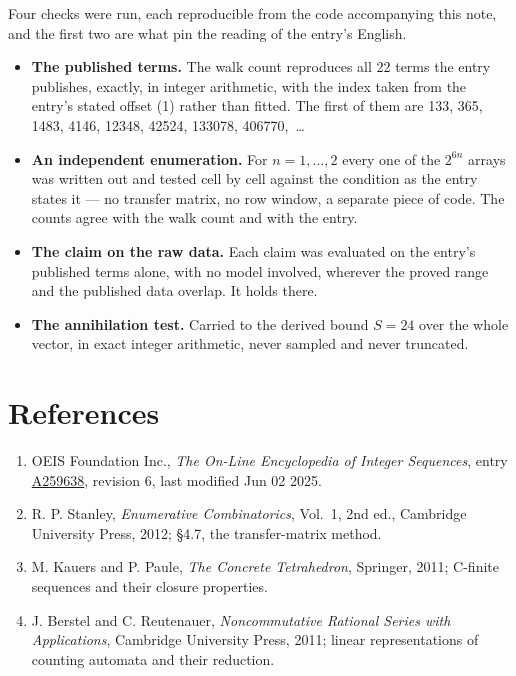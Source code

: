 \documentclass[11pt]{article}
\theoremstyle{definition}
\begin{document}
Four checks were run, each reproducible from the code accompanying this note, and the first two are what pin the reading of the entry's English.

\begin{itemize}

\item {\bfseries The published terms.} The walk count reproduces all 22 terms the entry publishes, exactly, in integer arithmetic, with the index taken from the entry's stated offset (1) rather than fitted. The first of them are 133, 365, 1483, 4146, 12348, 42524, 133078, 406770,~\dots

\item {\bfseries An independent enumeration.} For $n = 1,\dots,2$ every one of the $2^{6n}$ arrays was written out and tested cell by cell against the condition as the entry states it --- no transfer matrix, no row window, a separate piece of code. The counts agree with the walk count and with the entry.

\item {\bfseries The claim on the raw data.} Each claim was evaluated on the entry's published terms alone, with no model involved, wherever the proved range and the published data overlap. It holds there.

\item {\bfseries The annihilation test.} Carried to the derived bound $S = 24$ over the whole vector, in exact integer arithmetic, never sampled and never truncated.

\end{itemize}

\section{References}

\begin{enumerate}

\item OEIS Foundation Inc., \emph{The On-Line Encyclopedia of Integer Sequences}, entry \href{https://oeis.org/A259638}{A259638}, revision 6, last modified Jun 02 2025.

\item R. P. Stanley, \emph{Enumerative Combinatorics}, Vol.~1, 2nd ed., Cambridge University Press, 2012; \S4.7, the transfer-matrix method.

\item M. Kauers and P. Paule, \emph{The Concrete Tetrahedron}, Springer, 2011; C-finite sequences and their closure properties.

\item J. Berstel and C. Reutenauer, \emph{Noncommutative Rational Series with Applications}, Cambridge University Press, 2011; linear representations of counting automata and their reduction.

\end{enumerate}
\end{document}
